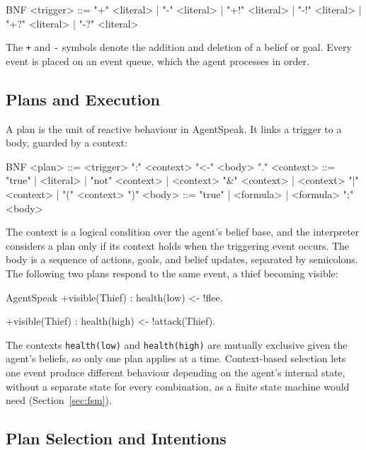 \begin{codeblock}[]{BNF}
    <trigger> ::= "+" <literal> | "-" <literal> | "+!" <literal> | "-!" <literal> | "+?" <literal> | "-?" <literal>
\end{codeblock}
 
The \lstinline|+| and \lstinline|-| symbols denote the addition and deletion of a belief or goal. Every event is placed on an event queue, which the agent processes in order.
 
\subsection{Plans and Execution}
\label{sec:agentspeak-plans}
 
A plan is the unit of reactive behaviour in AgentSpeak. It links a trigger to a body, guarded by a context:
 
\begin{codeblock}[]{BNF}
    <plan> ::= <trigger> ":" <context> "<-" <body> "."
    <context> ::= "true" | <literal> | "not" <context> | <context> "&" <context>
                | <context> "|" <context> | "(" <context> ")"
    <body> ::= "true" | <formula> | <formula> ";" <body>
\end{codeblock}
 
The context is a logical condition over the agent's belief base, and the interpreter considers a plan only if its context holds when the triggering event occurs. The body is a sequence of actions, goals, and belief updates, separated by semicolons. The following two plans respond to the same event, a thief becoming visible:
 
\begin{codeblock}[]{AgentSpeak}
+visible(Thief) : health(low) <- 
    !flee.
 
+visible(Thief) : health(high) <- 
    !attack(Thief).
\end{codeblock}
 
The contexts \lstinline|health(low)| and \lstinline|health(high)| are mutually exclusive given the agent's beliefs, so only one plan applies at a time. Context-based selection lets one event produce different behaviour depending on the agent's internal state, without a separate state for every combination, as a finite state machine would need (Section~\ref{sec:fsm}).
 
\subsection{Plan Selection and Intentions}
\label{sec:agentspeak-selection}
 
